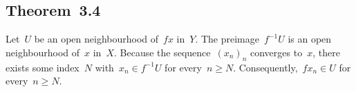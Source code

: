 \subsection{Theorem~3.4}

Let~$U$ be an open neighbourhood of~$fx$ in~$Y$.
The preimage~$f^{-1} U$ is an open neighbourhood of~$x$ in~$X$.
Because the sequence~$(x_n)_n$ converges to~$x$, there exists some index~$N$ with~$x_n ∈ f^{-1} U$ for every~$n ≥ N$.
Consequently,~$f x_n ∈ U$ for every~$n ≥ N$.

